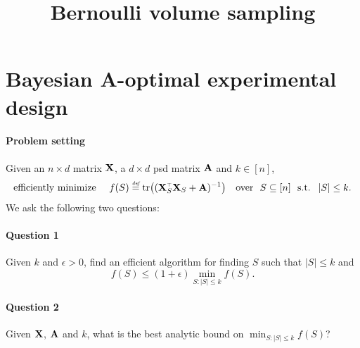 \documentclass[12pt]{sty/colt2019/colt2018-arxiv}
\title{Bernoulli volume sampling}
\begin{document}
\maketitle

\section{Bayesian A-optimal experimental design}

\paragraph{Problem setting} Given an $n\times d$ matrix $\mathbf X$,
a $d\times d$ psd matrix $\mathbf A$ and $k\in[n]$,
\begin{align*}
  \text{efficiently minimize }\quad
  f(S) \defeq \tr\big((\X_S^\top\X_S+\A)^{-1}\big)\quad\text{over }\ S\subseteq [n]
  \ \text{ s.t. }\ |S|\leq k.
\end{align*}
We ask the following two questions:
\paragraph{Question 1} Given $k$ and $\epsilon>0$, find an
efficient algorithm for finding $S$ such that $|S|\leq k$ and
\[ f(S)\leq (1+\epsilon)\min_{S:|S|\leq k}f(S).\]
\paragraph{Question 2} Given $\mathbf X$, $\mathbf A$ and $k$, what is the best
analytic bound on $\min_{S:|S|\leq k}f(S)$?
\vspace{3mm}
\end{document}
